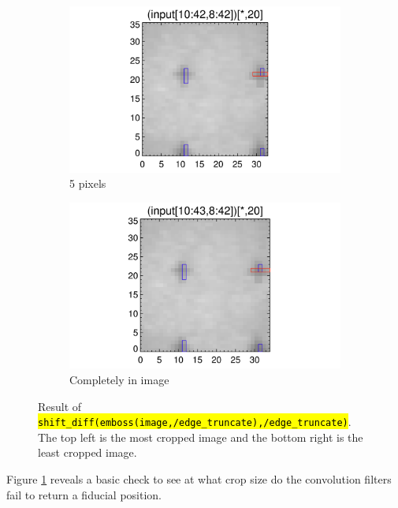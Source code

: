 \documentclass[10pt]{article}
\begin{document}
\begin{figure}[!h]
    \begin{subfigure}[b]{.45\linewidth}
        \centering
        \includegraphics[width=1.3\textwidth]{plots_tables_images/fidcheck_withbothtruncate4.png}
        \caption{5 pixels}
    \end{subfigure}
    \begin{subfigure}[b]{.45\linewidth}
        \centering
        \includegraphics[width=1.3\textwidth]{plots_tables_images/fidcheck_withbothtruncate5.png}
        \caption{Completely in image}
    \end{subfigure}
    \caption{Result of \hl{\texttt{shift\_diff(emboss(image,/edge\_truncate),/edge\_truncate)}}. The top left is the most cropped image and the bottom right is the least cropped image.}
    \label{firstplot}
\end{figure}

Figure \ref{firstplot} reveals a basic check to see at what crop size do the convolution filters fail to return a fiducial position. 
\end{document}
